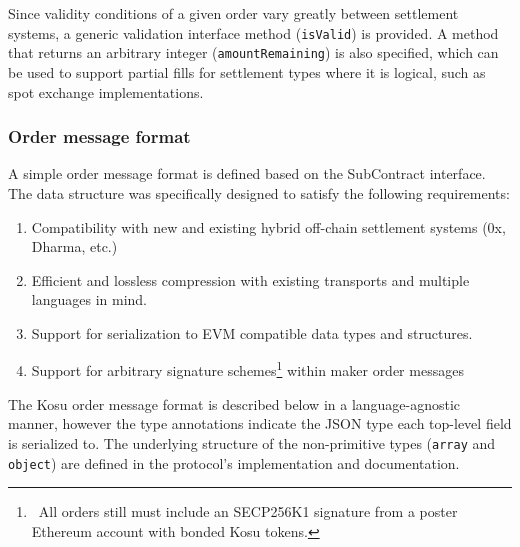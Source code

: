 \documentclass[10pt]{article}
\begin{document}
Since validity conditions of a given order vary greatly between settlement systems, a generic validation interface method (\texttt{isValid}) is provided. A method that returns an arbitrary integer (\texttt{amountRemaining}) is also specified, which can be used to support partial fills for settlement types where it is logical, such as spot exchange implementations.

\subsubsection{Order message format}\label{order-message-format}

A simple order message format is defined based on the SubContract interface. The data structure was specifically designed to satisfy the following requirements:

\begin{enumerate}
  \item Compatibility with new and existing hybrid off-chain settlement systems (0x\cite{0x-wp}, Dharma\cite{dharma-wp}, etc.)
  \item Efficient and lossless compression with existing transports and multiple languages in mind.
  \item Support for serialization to EVM compatible data types and structures.
  \item Support for arbitrary signature schemes\footnote{\ All orders still must include an SECP256K1 signature from a poster Ethereum account with bonded Kosu tokens.} within maker order messages
\end{enumerate}

The Kosu order message format is described below in a language-agnostic manner, however the type annotations indicate the JSON type each top-level field is serialized to. The underlying structure of the non-primitive types (\texttt{array} and \texttt{object}) are defined in the protocol's implementation\cite{kosu-monorepo} and documentation.
\end{document}
